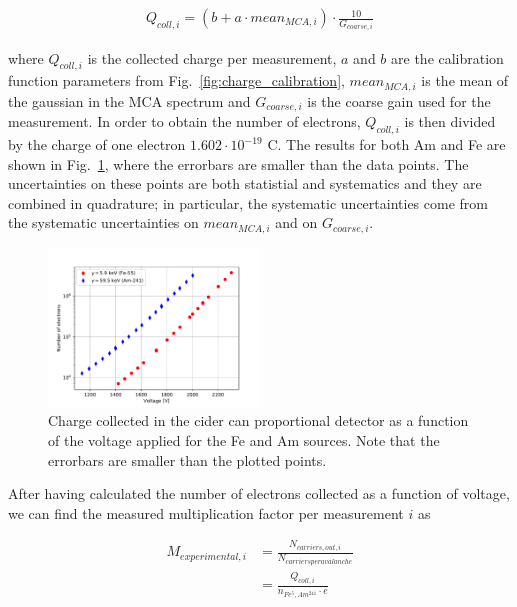 \begin{adjustwidth}{-1cm}{}
\begin{align}
Q_{coll, i} = (b + a \cdot mean_{MCA, i}) \cdot \frac{10}{G_{coarse, i}} 
\end{align}
\end{adjustwidth}

where $Q_{coll, i}$ is the collected charge per measurement, $a$ and $b$ are the calibration function parameters from Fig.~\ref{fig:charge_calibration}, $mean_{MCA, i}$ is the mean of the gaussian in the MCA spectrum and $G_{coarse, i}$ is the coarse gain used for the measurement. In order to obtain the number of electrons, $Q_{coll, i}$ is then divided by the charge of one electron $1.602 \cdot 10^{-19}$ C. The results for both Am and Fe are shown in Fig.~\ref{fig:number_of_electrons}, where the errorbars are smaller than the data points. The uncertainties on these points are both statistial and systematics and they are combined in quadrature; in particular, the systematic uncertainties come from the systematic uncertainties on $mean_{MCA, i}$ and on $G_{coarse, i}$.


\begin{figure}[htb]
  \includegraphics[width=0.5\textwidth]{graphics/numbervsvoltage.pdf}
  \caption{Charge collected in the cider can proportional detector as a function of the voltage applied for the Fe and Am sources. Note that the errorbars are smaller than the plotted points.}
  \label{fig:number_of_electrons}
\end{figure}

After having calculated the number of electrons collected as a function of voltage, we can find the measured multiplication factor per measurement $i$ as

\begin{align}
\label{eq:Mexp}
M_{experimental,i} &= \frac{N_{carriers,out,i}}{N_{carriers per avalanche}} \nonumber \\
                   &= \frac{Q_{coll,i}}{n_{Fe^{5},Am^{241}}\cdot e}
\end{align}

